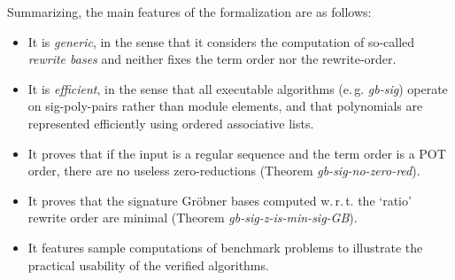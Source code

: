 \documentclass[11pt,a4paper]{article}
\begin{document}
Summarizing, the main features of the formalization are as follows:
\begin{itemize}
  \item It is \emph{generic}, in the sense that it considers the computation of so-called 
\emph{rewrite bases} and neither fixes the term order nor the rewrite-order.

  \item It is \emph{efficient}, in the sense that all executable algorithms (e.\,g. 
\textit{gb-sig}) operate on sig-poly-pairs rather than module elements, and that polynomials are 
represented efficiently using ordered associative lists.

  \item It proves that if the input is a regular sequence and the term order is a POT order, there
are no useless zero-reductions (Theorem \textit{gb-sig-no-zero-red}).

  \item It proves that the signature Gr\"obner bases computed w.\,r.\,t. the `ratio' rewrite order 
are minimal (Theorem \textit{gb-sig-z-is-min-sig-GB}).

  \item It features sample computations of benchmark problems to illustrate the practical usability 
of the verified algorithms.
\end{itemize}





\end{document}
